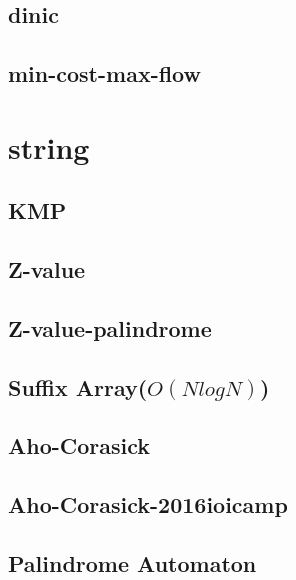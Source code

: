 \documentclass[12pt,twocolumn,oneside,a4paper]{article}
\begin{document}
\subsection{dinic}


\subsection{min-cost-max-flow}


\section{string}
\subsection{KMP}


\subsection{Z-value}


\subsection{Z-value-palindrome}


\subsection{Suffix Array(\(O(N log N)\))}


\subsection{Aho-Corasick}


\subsection{Aho-Corasick-2016ioicamp}


\subsection{Palindrome Automaton}

\end{document}
